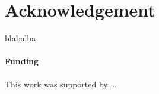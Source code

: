 \documentclass{bioinfo}
\begin{document}
\section*{Acknowledgement}
blabalba
\paragraph{Funding\textcolon}
This work was supported by …
 









\end{document}
